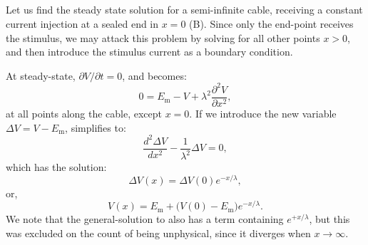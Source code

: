 \subsection{}
\label{sec:Neuron:cableSS}
Let us find the steady state solution for a semi-infinite cable, receiving a constant current injection at a sealed end in $x=0$ (B). Since only the end-point receives the stimulus, we may attack this problem by solving  for all other points $x>0$, and then introduce the stimulus current as a boundary condition. 

At steady-state, $\partial V/\partial t = 0$, and  becomes:
\begin{equation}
0 = E_\text{m}-V +  \lambda^2 \frac{\partial^2 V}{\partial x^2}, 
\label{eq:Neuron:semiinf}
\end{equation}
at all points along the cable, except $x=0$. If we introduce the new variable $\Delta{V}=V-E_\text{m}$,  simplifies to:
\begin{equation}
\frac{d^2 \Delta{V}}{d x^2} -  \frac{1}{\lambda^2} \Delta{V}=0, 
\label{eq:Neuron:semiinf2}
\end{equation}
which has the solution:
\begin{equation}
\Delta{V}(x) = \Delta{V}(0) e^{-x/\lambda}, 
\label{eq:Neuron:semiinf3}
\end{equation}
or, 
\begin{equation}
V(x) = E_\text{m} + \big( V(0)-E_\text{m} \big) e^{-x/\lambda}.
\label{eq:Neuron:semiinf4}
\end{equation}
We note that the general-solution to  also has a term containing $e^{+x/\lambda}$, but this was excluded on the count of being unphysical, since it diverges when $x \rightarrow \infty$. 

